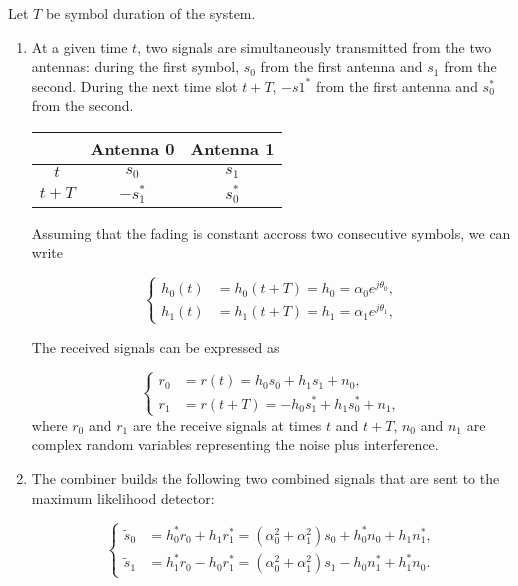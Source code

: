 \documentclass [a4paper, 11pt] {article}
\begin{document}
    \begin{solution}

         Let $T$ be symbol duration of the system.

\begin{enumerate}
    \item At a given time $t$, two signals are simultaneously transmitted from the two antennas: during the first symbol, $s_0$ from the first antenna and $s_1$ from the second. During the next time slot $t+T$, $-s1^*$ from the first antenna and $s_0^*$ from the second.

    \begin{center}
    \begin{tabular}{ |c|c|c| }
    \hline
     & Antenna 0 & Antenna 1 \\
     \hline
    $t$ & $s_0$ & $s_1$ \\
    \hline
    $t+T$ & $-s_1^*$ & $s_0^*$ \\
    \hline
    \end{tabular}
    \end{center}

    Assuming that the fading is constant accross two consecutive symbols, we can write

    \begin{equation}
    \begin{cases}
    h_0(t) &= h_0(t+T) = h_0 = \alpha_0e^{j\theta_0},\\
    h_1(t) &= h_1(t+T) = h_1 = \alpha_1e^{j\theta_1},
    \end{cases}
    \end{equation}

    The received signals can be expressed as

    \begin{equation}
    \begin{cases}
    r_0 &= r(t) = h_0s_0 + h_1s_1 + n_0,\\
    r_1 &= r(t+T) = -h_0s_1^* + h_1s_0^* + n_1,
    \end{cases}
    \end{equation}
    where $r_0$ and $r_1$ are the receive signals at times $t$ and $t+T$, $n_0$ and $n_1$ are complex random variables representing the noise plus interference.

    \item The combiner builds the following two combined signals that are sent to the maximum likelihood detector:

    \begin{equation}
    \begin{cases}
    \tilde{s}_0 &= h_0^*r_0 + h_1r_1^* = (\alpha_0^2 + \alpha_1^2)s_0 + h_0^*n_0 + h_1n_1^*, \\
    \tilde{s}_1 &= h_1^*r_0 - h_0r_1^* = (\alpha_0^2 + \alpha_1^2)s_1 - h_0n_1^* + h_1^*n_0.
    \end{cases}
    \end{equation}


\end{enumerate}
\end{solution}
\end{document}

